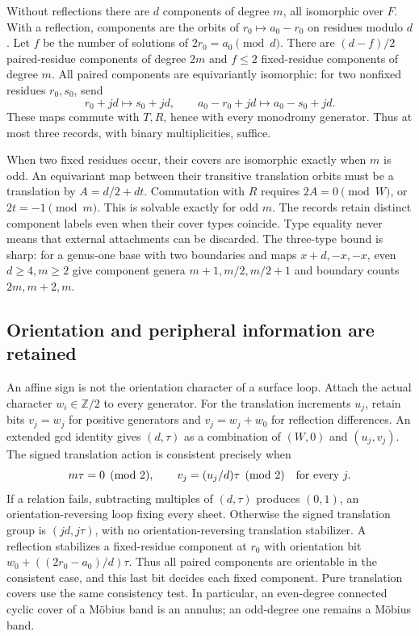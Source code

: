 Without reflections there are $d$ components of degree $m$, all isomorphic
over $F$.  With a reflection, components are the orbits of
$r_0\mapsto a_0-r_0$ on residues modulo $d$.  Let $f$ be the number of
solutions of $2r_0=a_0\pmod d$.  There are $(d-f)/2$ paired-residue
components of degree $2m$ and $f\le2$ fixed-residue components of degree $m$.
All paired components are equivariantly isomorphic: for two nonfixed
residues $r_0,s_0$, send
\[
 r_0+jd\mapsto s_0+jd,\qquad
 a_0-r_0+jd\mapsto a_0-s_0+jd.
\]
These maps commute with $T,R$, hence with every monodromy generator.
Thus at most three records, with binary multiplicities, suffice.

When two fixed residues occur, their covers are isomorphic exactly when
$m$ is odd.  An equivariant map between their transitive translation
orbits must be a translation by $A=d/2+dt$.  Commutation with $R$ requires
$2A=0\pmod W$, or $2t=-1\pmod m$.  This is solvable exactly for odd $m$.
The records retain distinct component labels even when their cover types
coincide.  Type equality never means that external attachments can be
discarded.  The three-type bound is sharp: for a genus-one base with two
boundaries and maps $x+d,-x,-x$, even $d\ge4,m\ge2$ give component genera
$m+1,m/2,m/2+1$ and boundary counts $2m,m+2,m$.

\subsection{Orientation and peripheral information are retained}

An affine sign is not the orientation character of a surface loop.
Attach the actual character $w_i\in\mathbb Z/2$ to every generator.
For the translation increments $u_j$, retain bits $v_j=w_j$ for positive
generators and $v_j=w_j+w_0$ for reflection differences.  An extended gcd
identity gives $(d,\tau)$ as a combination of $(W,0)$ and $(u_j,v_j)$.
The signed translation action is consistent precisely when
\[
 m\tau=0\pmod2,\qquad v_j=(u_j/d)\tau\pmod2\quad\hbox{for every }j.
\]
If a relation fails, subtracting multiples of $(d,\tau)$ produces
$(0,1)$, an orientation-reversing loop fixing every sheet.  Otherwise the
signed translation group is $(jd,j\tau)$, with no orientation-reversing
translation stabilizer.  A reflection stabilizes a fixed-residue component
at $r_0$ with orientation bit
$w_0+((2r_0-a_0)/d)\tau$.  Thus all paired components are orientable in
the consistent case, and this last bit decides each fixed component.
Pure translation covers use the same consistency test.  In particular,
an even-degree connected cyclic cover of a M\"obius band is an annulus;
an odd-degree one remains a M\"obius band.

